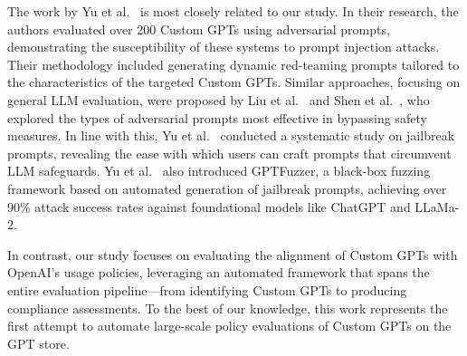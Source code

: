 The work by Yu et al.~\cite{yu2024assessingpromptinjection} is most closely related to our study. In their research, the authors evaluated over 200 Custom GPTs using adversarial prompts, demonstrating the susceptibility of these systems to prompt injection attacks. Their methodology included generating dynamic red-teaming prompts tailored to the characteristics of the targeted Custom GPTs. Similar approaches, focusing on general LLM evaluation, were proposed by Liu et al.~\cite{Liu2024} and Shen et al.~\cite{Shen2024DoAnythingNow}, who explored the types of adversarial prompts most effective in bypassing safety measures. In line with this, Yu et al.~\cite{Yu2024DontListen} conducted a systematic study on jailbreak prompts, revealing the ease with which users can craft prompts that circumvent LLM safeguards. Yu et al.~\cite{yu2024gptfuzzerredteaminglarge} also introduced GPTFuzzer, a black-box fuzzing framework based on automated generation of jailbreak prompts, achieving over 90\% attack success rates against foundational models like ChatGPT and LLaMa-2.

In contrast, our study focuses on evaluating the alignment of Custom GPTs with OpenAI’s usage policies, leveraging an automated framework that spans the entire evaluation pipeline—from identifying Custom GPTs to producing compliance assessments. To the best of our knowledge, this work represents the first attempt to automate large-scale policy evaluations of Custom GPTs on the GPT store.

